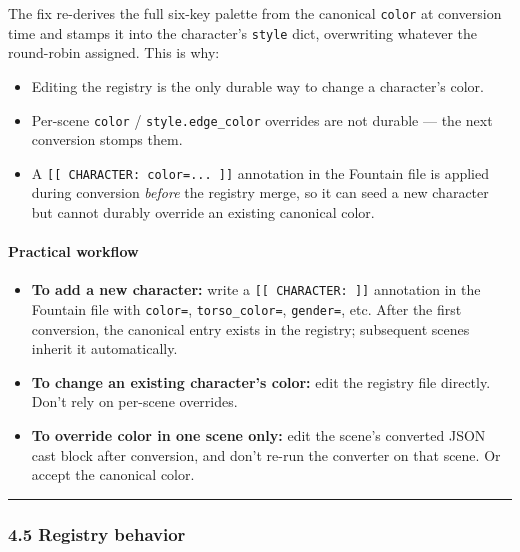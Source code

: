 \documentclass[
  12pt,
  letterpaper,
]{book}
\providecommand{\tightlist}{%
  \setlength{\itemsep}{0pt}\setlength{\parskip}{0pt}}
\begin{document}
The fix re-derives the full six-key palette from the canonical
\texttt{color} at conversion time and stamps it into the character's
\texttt{style} dict, overwriting whatever the round-robin assigned. This
is why:

\begin{itemize}
\tightlist
\item
  Editing the registry is the only durable way to change a character's
  color.
\item
  Per-scene \texttt{color} / \texttt{style.edge\_color} overrides are
  not durable --- the next conversion stomps them.
\item
  A \texttt{{[}{[}\ CHARACTER:\ color=...\ {]}{]}} annotation in the
  Fountain file is applied during conversion \emph{before} the registry
  merge, so it can seed a new character but cannot durably override an
  existing canonical color.
\end{itemize}

\paragraph{Practical workflow}\label{practical-workflow}

\begin{itemize}
\tightlist
\item
  \textbf{To add a new character:} write a
  \texttt{{[}{[}\ CHARACTER:\ {]}{]}} annotation in the Fountain file
  with \texttt{color=}, \texttt{torso\_color=}, \texttt{gender=}, etc.
  After the first conversion, the canonical entry exists in the
  registry; subsequent scenes inherit it automatically.
\item
  \textbf{To change an existing character's color:} edit the registry
  file directly. Don't rely on per-scene overrides.
\item
  \textbf{To override color in one scene only:} edit the scene's
  converted JSON cast block after conversion, and don't re-run the
  converter on that scene. Or accept the canonical color.
\end{itemize}

\begin{center}\rule{0.5\linewidth}{0.5pt}\end{center}

\subsubsection{4.5 Registry behavior}\label{registry-behavior}
\end{document}
